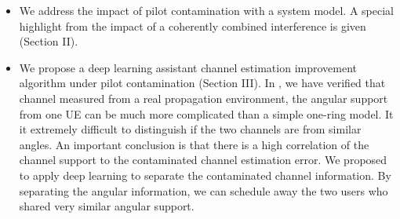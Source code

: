 \begin{itemize}

\item We address the impact of pilot contamination with a system model. A special highlight from the impact of a coherently combined interference is given (Section II). 

\item We propose a deep learning assistant channel estimation improvement algorithm under pilot contamination (Section III). In \cite{Chen2018pilot}, we have verified that channel measured from a real propagation environment, the angular support from one UE can be much more complicated than a simple one-ring model. It it extremely difficult to distinguish if the two channels are from similar angles. An important conclusion is that there is a high correlation of the channel support to the contaminated channel estimation error. We proposed to apply deep learning to separate the contaminated channel information. By separating the angular information, we can schedule away the two users who shared very similar angular support.


\end{itemize}
